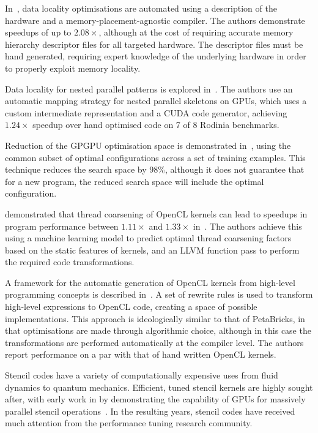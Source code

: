 In~\cite{Chen2014}, data locality optimisations are automated using a description of the hardware and a memory-placement-agnostic compiler. The authors demonstrate speedups of up to $2.08\times$, although at the cost of requiring accurate memory hierarchy descriptor files for all targeted hardware. The descriptor files must be hand generated, requiring expert knowledge of the underlying hardware in order to properly exploit memory locality.

Data locality for nested parallel patterns is explored in~\cite{Lee}. The authors use an automatic mapping strategy for nested parallel skeletons on GPUs, which uses a custom intermediate representation and a CUDA code generator, achieving $1.24\times$ speedup over hand optimised code on 7 of 8 Rodinia benchmarks.

Reduction of the GPGPU optimisation space is demonstrated in~\cite{Ryoo2008}, using the common subset of optimal configurations across a set of training examples. This technique reduces the search space by 98\%, although it does not guarantee that for a new program, the reduced search space will include the optimal configuration.

\citeauthor{Magni2014} demonstrated that thread coarsening of OpenCL kernels can lead to speedups in program performance between $1.11\times$ and $1.33\times$ in~\cite{Magni2014}. The authors achieve this using a machine learning model to predict optimal thread coarsening factors based on the static features of kernels, and an LLVM function pass to perform the required code transformations.

A framework for the automatic generation of OpenCL kernels from high-level programming concepts is described in~\cite{Steuwer2015}. A set of rewrite rules is used to transform high-level expressions to OpenCL code, creating a space of possible implementations. This approach is ideologically similar to that of PetaBricks, in that optimisations are made through algorithmic choice, although in this case the transformations are performed automatically at the compiler level. The authors report performance on a par with that of hand written OpenCL kernels.

Stencil codes have a variety of computationally expensive uses from fluid dynamics to quantum mechanics. Efficient, tuned stencil kernels are highly sought after, with early work in \citeyear{Bolz2003} by \citeauthor{Bolz2003} demonstrating the capability of GPUs for massively parallel stencil operations~\cite{Bolz2003}. In the resulting years, stencil codes have received much attention from the performance tuning research community.

